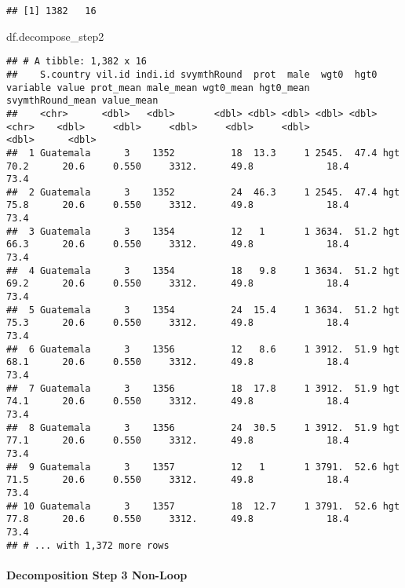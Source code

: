 \documentclass[
]{book}
\newenvironment{Shaded}{\begin{snugshade}}{\end{snugshade}}
\newcommand{\NormalTok}[1]{#1}
\begin{document}
\begin{verbatim}
## [1] 1382   16
\end{verbatim}

\begin{Shaded}
\begin{Highlighting}[]
\NormalTok{df.decompose_step2}
\end{Highlighting}
\end{Shaded}

\begin{verbatim}
## # A tibble: 1,382 x 16
##    S.country vil.id indi.id svymthRound  prot  male  wgt0  hgt0 variable value prot_mean male_mean wgt0_mean hgt0_mean svymthRound_mean value_mean
##    <chr>      <dbl>   <dbl>       <dbl> <dbl> <dbl> <dbl> <dbl> <chr>    <dbl>     <dbl>     <dbl>     <dbl>     <dbl>            <dbl>      <dbl>
##  1 Guatemala      3    1352          18  13.3     1 2545.  47.4 hgt       70.2      20.6     0.550     3312.      49.8             18.4       73.4
##  2 Guatemala      3    1352          24  46.3     1 2545.  47.4 hgt       75.8      20.6     0.550     3312.      49.8             18.4       73.4
##  3 Guatemala      3    1354          12   1       1 3634.  51.2 hgt       66.3      20.6     0.550     3312.      49.8             18.4       73.4
##  4 Guatemala      3    1354          18   9.8     1 3634.  51.2 hgt       69.2      20.6     0.550     3312.      49.8             18.4       73.4
##  5 Guatemala      3    1354          24  15.4     1 3634.  51.2 hgt       75.3      20.6     0.550     3312.      49.8             18.4       73.4
##  6 Guatemala      3    1356          12   8.6     1 3912.  51.9 hgt       68.1      20.6     0.550     3312.      49.8             18.4       73.4
##  7 Guatemala      3    1356          18  17.8     1 3912.  51.9 hgt       74.1      20.6     0.550     3312.      49.8             18.4       73.4
##  8 Guatemala      3    1356          24  30.5     1 3912.  51.9 hgt       77.1      20.6     0.550     3312.      49.8             18.4       73.4
##  9 Guatemala      3    1357          12   1       1 3791.  52.6 hgt       71.5      20.6     0.550     3312.      49.8             18.4       73.4
## 10 Guatemala      3    1357          18  12.7     1 3791.  52.6 hgt       77.8      20.6     0.550     3312.      49.8             18.4       73.4
## # ... with 1,372 more rows
\end{verbatim}

\hypertarget{decomposition-step-3-non-loop}{%
\paragraph{Decomposition Step 3 Non-Loop}\label{decomposition-step-3-non-loop}}
\end{document}
